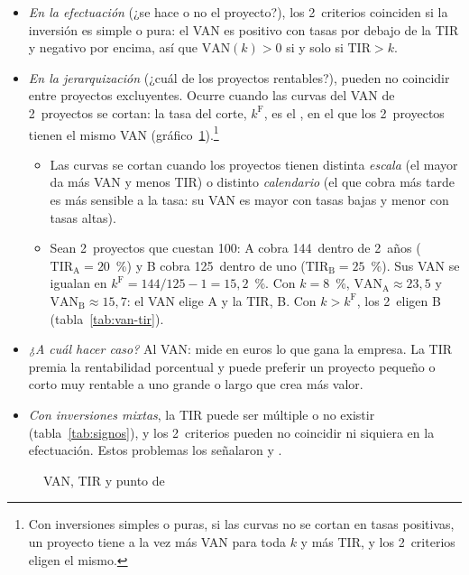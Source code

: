 \documentclass[11pt]{article}
\begin{document}
\begin{itemize}
\item \emph{En la efectuación} (¿se hace o no el proyecto?), los 2~criterios coinciden si la inversión es simple o pura: el VAN es positivo con tasas por debajo de la TIR y negativo por encima, así que $\mathrm{VAN}(k)>0$ si y solo si $\mathrm{TIR}>k$.
\item \emph{En la jerarquización} (¿cuál de los proyectos rentables?), pueden no coincidir entre proyectos excluyentes. Ocurre cuando las curvas del VAN de 2~proyectos se cortan: la tasa del corte, $k^{\mathrm F}$, es el , en el que los 2~proyectos tienen el mismo VAN (gráfico~\ref{fig:van-fisher}).\footnote{Con inversiones simples o puras, si las curvas no se cortan en tasas positivas, un proyecto tiene a la vez más VAN para toda $k$ y más TIR, y los 2~criterios eligen el mismo.}
  \begin{itemize}
  \item Las curvas se cortan cuando los proyectos tienen distinta \emph{escala} (el mayor da más VAN y menos TIR) o distinto \emph{calendario} (el que cobra más tarde es más sensible a la tasa: su VAN es mayor con tasas bajas y menor con tasas altas).
  \item Sean 2~proyectos que cuestan 100: A cobra 144~dentro de 2~años ($\mathrm{TIR}_{\mathrm A}=20$~\%) y B cobra 125~dentro de uno ($\mathrm{TIR}_{\mathrm B}=25$~\%). Sus VAN se igualan en $k^{\mathrm F}=144/125-1=15{,}2$~\%. Con $k=8$~\%, $\mathrm{VAN}_{\mathrm A}\approx23{,}5$ y $\mathrm{VAN}_{\mathrm B}\approx15{,}7$: el VAN elige A y la TIR, B. Con $k>k^{\mathrm F}$, los 2~eligen B (tabla~\ref{tab:van-tir}).
  \end{itemize}
\item \emph{¿A cuál hacer caso?} Al VAN: mide en euros lo que gana la empresa. La TIR premia la rentabilidad porcentual y puede preferir un proyecto pequeño o corto muy rentable a uno grande o largo que crea más valor.
\item \emph{Con inversiones mixtas}, la TIR puede ser múltiple o no existir (tabla~\ref{tab:signos}), y los 2~criterios pueden no coincidir ni siquiera en la efectuación. Estos problemas los señalaron \textcite{LorieSavage1955Three} y \textcite{Hirshleifer1958Optimal}.
\end{itemize}

\begin{figure}[H]
\centering
\caption{VAN, TIR y punto de }\label{fig:van-fisher}
\end{figure}
\end{document}
